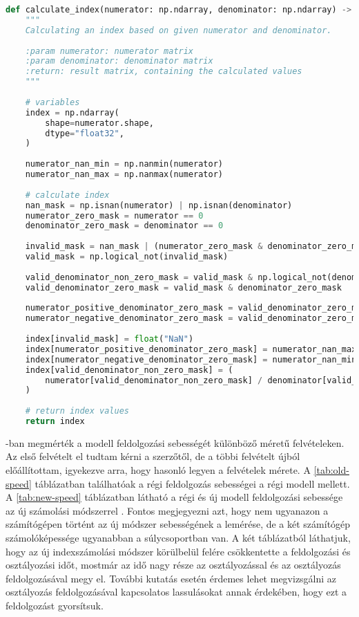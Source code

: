 \begin{lstlisting}[language={Python}]
def calculate_index(numerator: np.ndarray, denominator: np.ndarray) -> np.ndarray:
    """
    Calculating an index based on given numerator and denominator.
    
    :param numerator: numerator matrix
    :param denominator: denominator matrix
    :return: result matrix, containing the calculated values
    """
    
    # variables
    index = np.ndarray(
        shape=numerator.shape,
        dtype="float32",
    )
    
    numerator_nan_min = np.nanmin(numerator)
    numerator_nan_max = np.nanmax(numerator)
    
    # calculate index
    nan_mask = np.isnan(numerator) | np.isnan(denominator)
    numerator_zero_mask = numerator == 0
    denominator_zero_mask = denominator == 0
    
    invalid_mask = nan_mask | (numerator_zero_mask & denominator_zero_mask)
    valid_mask = np.logical_not(invalid_mask)
    
    valid_denominator_non_zero_mask = valid_mask & np.logical_not(denominator_zero_mask)
    valid_denominator_zero_mask = valid_mask & denominator_zero_mask
    
    numerator_positive_denominator_zero_mask = valid_denominator_zero_mask & (numerator > 0)
    numerator_negative_denominator_zero_mask = valid_denominator_zero_mask & (numerator < 0)
    
    index[invalid_mask] = float("NaN")
    index[numerator_positive_denominator_zero_mask] = numerator_nan_max
    index[numerator_negative_denominator_zero_mask] = numerator_nan_min
    index[valid_denominator_non_zero_mask] = (
        numerator[valid_denominator_non_zero_mask] / denominator[valid_denominator_non_zero_mask]
    )
    
    # return index values
    return index
\end{lstlisting}

\cite{magyar2023}-ban megmérték a modell feldolgozási sebességét különböző méretű felvételeken. Az első felvételt el tudtam kérni a szerzőtől, de a többi felvételt újból előállítottam, igyekezve arra, hogy hasonló legyen a felvételek mérete. A \ref{tab:old-speed} táblázatban találhatóak a régi feldolgozás sebességei a régi modell mellett. A \ref{tab:new-speed} táblázatban látható a régi és új modell feldolgozási sebessége az új számolási módszerrel . Fontos megjegyezni azt, hogy nem ugyanazon a számítógépen történt az új módszer sebességének a lemérése, de a két számítógép számolóképessége ugyanabban a súlycsoportban van. A két táblázatból láthatjuk, hogy az új indexszámolási módszer körülbelül felére csökkentette a feldolgozási és osztályozási időt, mostmár az idő nagy része az osztályozással és az osztályozás feldolgozásával megy el. További kutatás esetén érdemes lehet megvizsgálni az osztályozás feldolgozásával kapcsolatos lassulásokat annak érdekében, hogy ezt a feldolgozást gyorsítsuk.

